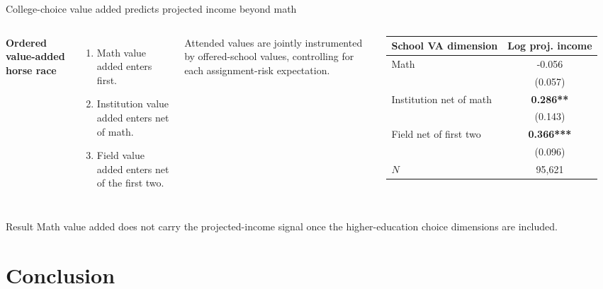\documentclass[11pt,aspectratio=169]{beamer}
\begin{document}
\begin{frame}{College-choice value added predicts projected income beyond math}
\begin{columns}[c,onlytextwidth]
  \textbf{Ordered value-added horse race}
  \begin{enumerate}
    \item Math value added enters first.
    \item Institution value added enters net of math.
    \item Field value added enters net of the first two.
  \end{enumerate}

  \footnotesize
  Attended values are jointly instrumented by offered-school values, controlling for each assignment-risk expectation.

  \centering
  \small
  \begin{tabular}{lc}
  \toprule
  School VA dimension & Log proj. income \\
  \midrule
  Math & -0.056 \\
   & (0.057) \\
  Institution net of math & \textbf{0.286**} \\
   & (0.143) \\
  Field net of first two & \textbf{0.366***} \\
   & (0.096) \\
  \midrule
  $N$ & 95,621 \\
  \bottomrule
  \end{tabular}
\end{columns}

\vspace{0.5em}
\begin{alertblock}{Result}
Math value added does not carry the projected-income signal once the higher-education choice dimensions are included.
\end{alertblock}
\end{frame}

\section{Conclusion}
\end{document}
